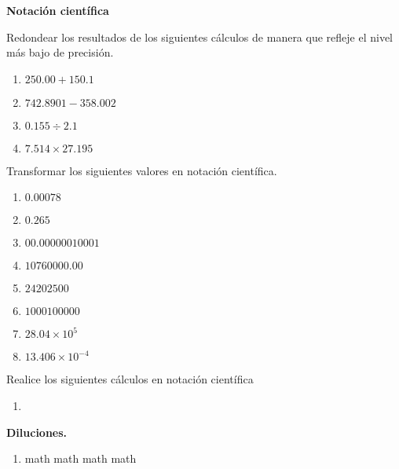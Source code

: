 \documentclass[12pt,a4paper]{article}
\newcommand{\sect}[1]{
	\begin{tcolorbox}[colframe= white,top=2pt, bottom=2pt, colback = gris]
	 \textbf{#1} %
    \end{tcolorbox}
 }
\begin{document}
\begin{multicols}{2}
    \raggedcolumns
    
\sect{Notaci\'on cient\'ifica}

\begin{Exercice} Redondear los resultados de los siguientes c\'alculos de manera que refleje el nivel m\'as bajo de precisi\'on.
	
	\begin{enumerate}[1)]
		\item $250.00 + 150.1$
		\item $742.8901 - 358.002$
		\item $0.155 \div 2.1$
		\item $7.514 \times 27.195$
	\end{enumerate}
	
\end{Exercice}
    
\begin{Exercice} Transformar los siguientes valores en notaci\'on cient\'ifica.
     	
\begin{enumerate}[1)]
	\item $0.00078$
	\item $0.265$	
	\item $00.00000010001$
	\item $10760000.00$
	\item $24202500$
	\item $1000100000$
	\item $28.04 \times 10^{5}$
	\item $13.406 \times 10^{-4}$
\end{enumerate}

\end{Exercice}

\begin{Exercice} Realice los siguientes c\'alculos en notaci\'on cient\'ifica 
	
	\begin{enumerate}[1)]
		\item 
	\end{enumerate}

\end{Exercice}

    \sect{Diluciones.}

\begin{Exercice}
	
	\begin{enumerate}[1)]
	    
	    \item math math math math
	        

\end{enumerate}
\end{Exercice}
\end{multicols}
\end{document}
